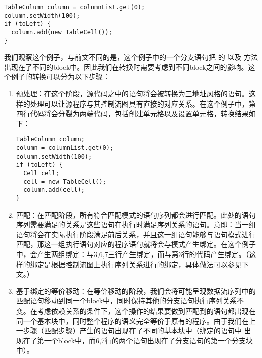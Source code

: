 \begin{center}
\begin{smpage}{0.5\columnwidth}
\begin{lstlisting}[style=java]
TableColumn column = columnList.get(0);
column.setWidth(100);
if (toLeft) {
  column.add(new TableCell());
} 
\end{lstlisting}
\end{smpage}
\end{center}

我们观察这个例子，与前文不同的是，这个例子中的一个分支语句把  的  以及  方法出现在了不同的block中。因此我们在转换时需要考虑到不同block之间的影响。这个例子的转换可以分为以下步骤：

\begin{enumerate}
\item 预处理：在这个阶段，源代码之中的语句将会被转换为三地址风格的语句。这样的处理可以让源程序与其控制流图具有直接的对应关系。在这个例子中，第四行代码将会分裂为两端代码，包括创建单元格以及设置单元格，转换结果如下：
\begin{center}
\begin{smpage}{0.5\columnwidth}
\begin{lstlisting}[style=java]
TableColumn column;
column = columnList.get(0);
column.setWidth(100);
if (toLeft) {
  Cell cell;
  cell = new TableCell();
  column.add(cell);
} 
\end{lstlisting}
\end{smpage}
\end{center}

\item 匹配：在匹配阶段，所有符合匹配模式的语句序列都会进行匹配。此处的语句序列需要满足的关系是这些语句在执行时满足序列关系的语句。意即：当一组语句将会在实际执行阶段满足前后关系，并且这一组语句能够与语句模式进行匹配，那这一组执行语句对应的程序语句就将会与模式产生绑定。在这个例子中，会产生两组绑定：与3,6,7三行产生绑定，而与第3行的代码产生绑定。（这样的绑定是根据控制流图上执行序列关系进行的绑定，具体做法可以参见下文。）
\item 基于绑定的等价移动：在等价移动的阶段，我们会将可能呈现数据流序列中的匹配语句移动到同一个block中，同时保持其他的分支语句执行序列关系不变。在考虑依赖关系的条件下，这个操作的结果要做到匹配到的语句都出现在同一个基本块中，同时整个程序的语义完全等价于原有的程序。由于我们在上一步骤（匹配步骤）产生的语句出现在了不同的基本块中（绑定的语句中  出现在了第一个block中，而6,7行的两个语句出现在了分支语句的第一个分支块中）。


\end{enumerate}
